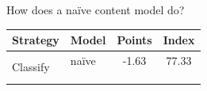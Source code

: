 \begin{frame}{How does a na\"ive content model do?}
\begin{center}
\begin{tabular}{ll|c|c}
Strategy &  Model    &	Points &	Index\\
\hline
\multirow{4}{*}{Classify}
& na\"ive & -1.63 & 77.33 \\
& & & \\
& & & \\
& & & \\
\hline
\end{tabular}
\end{center}

\end{frame}

\fi

